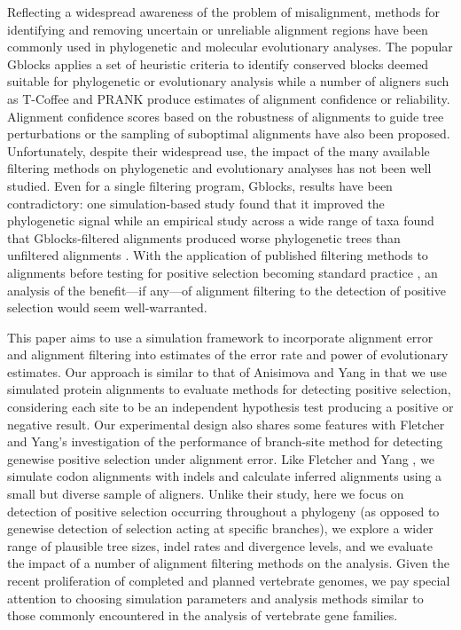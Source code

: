 \documentclass{mbe}
\begin{document}
Reflecting a widespread awareness of the problem of misalignment,
methods for identifying and removing uncertain or unreliable alignment
regions have been commonly used in phylogenetic and molecular
evolutionary analyses. The popular Gblocks applies a set of heuristic
criteria to identify conserved blocks deemed suitable for phylogenetic
or evolutionary analysis \citep{Castresana2000Selection} while a
number of aligners such as T-Coffee \citep{Notredame2000TCoffee} and
PRANK \citep{Loytynoja2005From} produce estimates of alignment
confidence or reliability. Alignment confidence scores based on the
robustness of alignments to guide tree perturbations
\citep{Penn2010Alignment} or the sampling of suboptimal alignments
\citep{Kim2011PSAR} have also been proposed. Unfortunately, despite
their widespread use, the impact of the many available filtering
methods on phylogenetic and evolutionary analyses has not been well
studied. Even for a single filtering program, Gblocks, results have
been contradictory: one simulation-based study found that it improved
the phylogenetic signal \citep{Talavera2007Improvement} while an
empirical study across a wide range of taxa found that
Gblocks-filtered alignments produced worse phylogenetic trees than
unfiltered alignments \citep{Dessimoz2010Phylogenetic}. With the
application of published filtering methods to alignments before
testing for positive selection becoming standard practice
\citep{Studer2008Pervasive,Aguileta2009Rapidly}, an analysis of the
benefit---if any---of alignment filtering to the detection of positive
selection would seem well-warranted.

This paper aims to use a simulation framework to incorporate alignment
error and alignment filtering into estimates of the error rate and
power of \sw evolutionary estimates. Our approach is similar to that
of Anisimova and Yang \citeyearpar{Anisimova2002Accuracy} in that we
use simulated protein alignments to evaluate methods for detecting \sw
positive selection, considering each site to be an independent
hypothesis test producing a positive or negative result. Our
experimental design also shares some features with Fletcher and Yang's
\citeyearpar{Fletcher2010Effect} investigation of the performance of
branch-site method for detecting genewise positive selection under
alignment error. Like Fletcher and Yang
\citeyearpar{Fletcher2010Effect}, we simulate codon alignments with
indels and calculate inferred alignments using a small but diverse
sample of aligners. Unlike their study, here we focus on \sw detection
of positive selection occurring throughout a phylogeny (as opposed to
genewise detection of selection acting at specific branches), we
explore a wider range of plausible tree sizes, indel rates and
divergence levels, and we evaluate the impact of a number of alignment
filtering methods on the \sw analysis. Given the recent proliferation
of completed and planned vertebrate genomes, we pay special attention
to choosing simulation parameters and analysis methods similar to
those commonly encountered in the \sw analysis of vertebrate gene
families.
\end{document}
